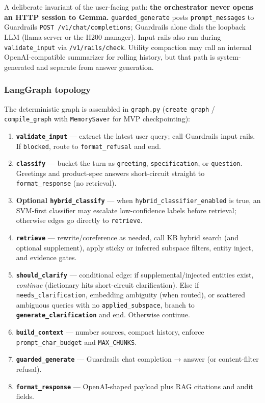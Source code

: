 \documentclass[
  11pt,
]{article}
\providecommand{\tightlist}{%
  \setlength{\itemsep}{0pt}\setlength{\parskip}{0pt}}
\begin{document}
A deliberate invariant of the user-facing path: \textbf{the orchestrator
never opens an HTTP session to Gemma.} \texttt{guarded\_generate} posts
\texttt{prompt\_messages} to Guardrails
\texttt{POST\ /v1/chat/completions}; Guardrails alone dials the loopback
LLM (llama-server or the H200 manager). Input rails also run during
\texttt{validate\_input} via \texttt{/v1/rails/check}. Utility
compaction may call an internal OpenAI-compatible summarizer for rolling
history, but that path is system-generated and separate from answer
generation.

\subsubsection{LangGraph topology}\label{langgraph-topology}

The deterministic graph is assembled in \texttt{graph.py}
(\texttt{create\_graph} / \texttt{compile\_graph} with
\texttt{MemorySaver} for MVP checkpointing):

\begin{enumerate}
\def\labelenumi{\arabic{enumi}.}
\tightlist
\item
  \textbf{\texttt{validate\_input}} --- extract the latest user query;
  call Guardrails input rails. If \texttt{blocked}, route to
  \texttt{format\_refusal} and end.
\item
  \textbf{\texttt{classify}} --- bucket the turn as \texttt{greeting},
  \texttt{specification}, or \texttt{question}. Greetings and
  product-spec answers short-circuit straight to
  \texttt{format\_response} (no retrieval).
\item
  \textbf{Optional \texttt{hybrid\_classify}} --- when
  \texttt{hybrid\_classifier\_enabled} is true, an SVM-first classifier
  may escalate low-confidence labels before retrieval; otherwise edges
  go directly to \texttt{retrieve}.
\item
  \textbf{\texttt{retrieve}} --- rewrite/coreference as needed, call KB
  hybrid search (and optional supplement), apply sticky or inferred
  subspace filters, entity inject, and evidence gates.
\item
  \textbf{\texttt{should\_clarify}} --- conditional edge: if
  supplemental/injected entities exist, \emph{continue} (dictionary hits
  short-circuit clarification). Else if \texttt{needs\_clarification},
  embedding ambiguity (when routed), or scattered ambiguous queries with
  no \texttt{applied\_subspace}, branch to
  \textbf{\texttt{generate\_clarification}} and end. Otherwise continue.
\item
  \textbf{\texttt{build\_context}} --- number sources, compact history,
  enforce \texttt{prompt\_char\_budget} and \texttt{MAX\_CHUNKS}.
\item
  \textbf{\texttt{guarded\_generate}} --- Guardrails chat completion →
  answer (or content-filter refusal).
\item
  \textbf{\texttt{format\_response}} --- OpenAI-shaped payload plus RAG
  citations and audit fields.
\end{enumerate}
\end{document}
